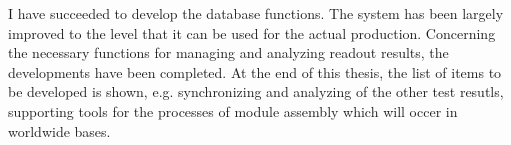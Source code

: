 I have succeeded to develop the database functions. 
The system has been largely improved to the level that it can be used for the actual production.
Concerning the necessary functions for managing and analyzing readout results, the developments have been completed.
At the end of this thesis, the list of items to be developed is shown, e.g. synchronizing and analyzing of the other test resutls, supporting tools for the processes of module assembly which will occer in worldwide bases.
